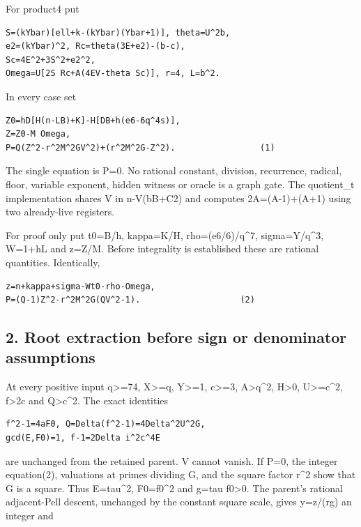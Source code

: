 For product4 put

\begin{verbatim}
S=(kYbar)[ell+k-(kYbar)(Ybar+1)], theta=U^2b,
e2=(kYbar)^2, Rc=theta(3E+e2)-(b-c),
Sc=4E^2+3S^2+e2^2,
Omega=U[2S Rc+A(4EV-theta Sc)], r=4, L=b^2.
\end{verbatim}

In every case set

\begin{verbatim}
Z0=hD[H(n-LB)+K]-H[DB+h(e6-6q^4s)],
Z=Z0-M Omega,
P=Q(Z^2-r^2M^2GV^2)+(r^2M^2G-Z^2).                 (1)
\end{verbatim}

The single equation is P=0. No rational constant, division, recurrence,
radical, floor, variable exponent, hidden witness or oracle is a graph
gate. The quotient\_t implementation shares V in n-V(bB+C2) and computes
2A=(A-1)+(A+1) using two already-live registers.

For proof only put t0=B/h, kappa=K/H, rho=(e6/6)/q\^{}7, sigma=Y/q\^{}3,
W=1+hL and z=Z/M. Before integrality is established these are rational
quantities. Identically,

\begin{verbatim}
z=n+kappa+sigma-Wt0-rho-Omega,
P=(Q-1)Z^2-r^2M^2G(QV^2-1).                    (2)
\end{verbatim}

\subsection{2. Root extraction before sign or denominator
assumptions}\label{root-extraction-before-sign-or-denominator-assumptions}

At every positive input q\textgreater=74, X\textgreater=q,
Y\textgreater=1, c\textgreater=3, A\textgreater q\^{}2, H\textgreater0,
U\textgreater=c\^{}2, f\textgreater2c and Q\textgreater c\^{}2. The
exact identities

\begin{verbatim}
f^2-1=4aF0, Q=Delta(f^2-1)=4Delta^2U^2G,
gcd(E,F0)=1, f-1=2Delta i^2c^4E
\end{verbatim}

are unchanged from the retained parent. V cannot vanish. If P=0, the
integer equation(2), valuations at primes dividing G, and the square
factor r\^{}2 show that G is a square. Thus E=tau\^{}2, F0=f0\^{}2 and
g=tau f0\textgreater0. The parent's rational adjacent-Pell descent,
unchanged by the constant square scale, gives y=\textbar z\textbar/(rg)
an integer and


